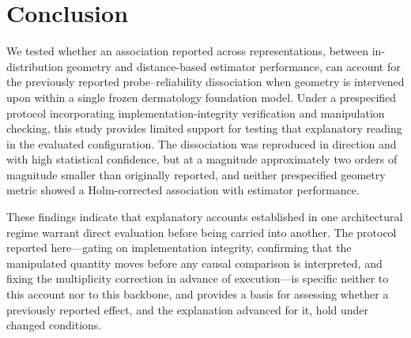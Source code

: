 %

\section{Conclusion}

We tested whether an association reported across representations, between
in-distribution geometry and distance-based estimator performance, can
account for the previously reported probe--reliability dissociation when
geometry is intervened upon within a single frozen dermatology foundation
model. Under a prespecified protocol incorporating implementation-integrity
verification and manipulation checking, this study provides limited support
for testing that explanatory reading in the evaluated configuration. The dissociation was
reproduced in direction and with high statistical confidence, but at a
magnitude approximately two orders of magnitude smaller than originally
reported, and neither prespecified geometry metric showed a Holm-corrected
association with estimator performance.

These findings indicate that explanatory accounts established in one
architectural regime warrant direct evaluation before being carried into
another. The protocol reported here---gating on implementation integrity,
confirming that the manipulated quantity moves before any causal comparison
is interpreted, and fixing the multiplicity correction in advance of
execution---is specific neither to this account nor to this backbone, and
provides a basis for assessing whether a previously reported effect, and the
explanation advanced for it, hold under changed conditions.
